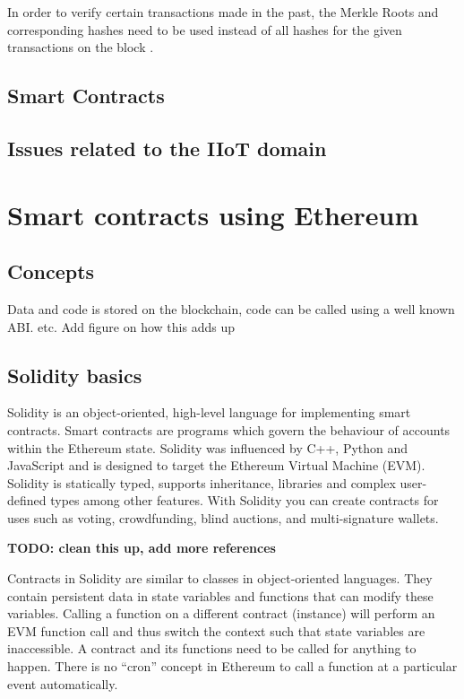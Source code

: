 \documentclass[a4paper]{article}
\begin{document}
In order to verify certain transactions made in the past, the Merkle Roots and corresponding hashes need to be used instead of all hashes for the given transactions on the block \cite{IOTA_Merkle}. 



\subsection{Smart Contracts}

\subsection{Issues related to the IIoT domain}


\section{Smart contracts using Ethereum}
\subsection{Concepts}\label{sec:EthSmartContracConcepts}

Data and code is stored on the blockchain, code can be called using a well known ABI. etc. Add figure on how this adds up

\subsection{Solidity basics}

Solidity is an object-oriented, high-level language for implementing smart contracts. Smart contracts are programs which govern the behaviour of accounts within the Ethereum state. Solidity was influenced by C++, Python and JavaScript and is designed to target the Ethereum Virtual Machine (EVM).
Solidity is statically typed, supports inheritance, libraries and complex user-defined types among other features. With Solidity you can create contracts for uses such as voting, crowdfunding, blind auctions, and multi-signature wallets.\cite{solidity_manual}

\textbf{TODO: clean this up, add more references}


Contracts in Solidity are similar to classes in object-oriented languages. They contain persistent data in state variables and functions that can modify these variables. Calling a function on a different contract (instance) will perform an EVM function call and thus switch the context such that state variables are inaccessible. A contract and its functions need to be called for anything to happen. There is no “cron” concept in Ethereum to call a function at a particular event automatically.
\end{document}
